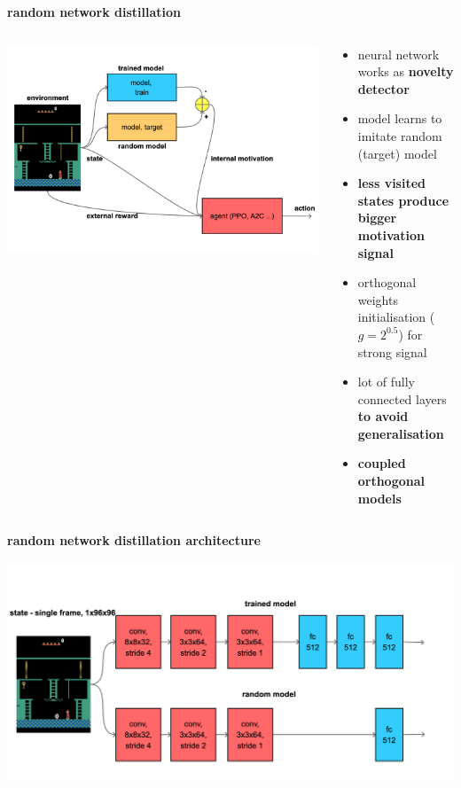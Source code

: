 \documentclass[xcolor=dvipsnames]{beamer}
\begin{document}
\begin{frame}{\bf random network distillation}

  \begin{columns}

    \begin{column}{0.5\textwidth}
      \includegraphics[scale=0.1]{../diagrams/rnd/rnd.png}
    \end{column}

    \begin{column}{0.5\textwidth}
      \begin{itemize}
        \item neural network works as {\bf novelty detector}
        \item model learns to imitate random (target) model
        \item {\bf less visited states produce bigger motivation signal}
        \item orthogonal weights initialisation ($g=2^{0.5}$) for strong signal
        \item lot of fully connected layers {\bf to avoid generalisation}
        \item {\bf coupled orthogonal models}
      \end{itemize}
    \end{column}


  \end{columns}

\end{frame}


\begin{frame}{\bf random network distillation architecture}

\centering
\includegraphics[scale=0.12]{../diagrams/rnd/modelrnd.png}

\end{frame}
\end{document}
